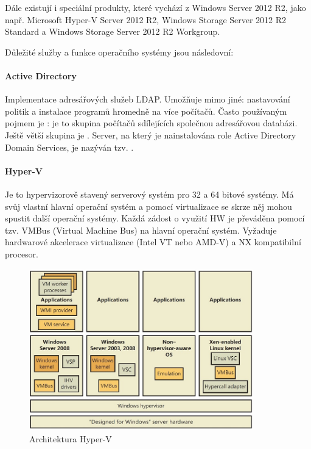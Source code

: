 Dále existují i speciální produkty, které vychází z Windows Server 2012 R2, jako např. Microsoft Hyper-V Server 2012 R2, Windows Storage Server 2012 R2 Standard a Windows Storage Server 2012 R2 Workgroup.

Důležité služby a funkce operačního systémy jsou následovní:

\paragraph{Active Directory}
Implementace adresářových služeb LDAP. Umožňuje mimo jiné: nastavování politik a instalace programů hromedně na více počítačů. Často používaným pojmem je : je to skupina počítačů sdílejících společnou adresářovou databázi. Ještě větší skupina je . Server, na který je nainstalována role Active Directory Domain Services, je nazýván tzv. . \cite{MasteringWindowsServer}

\paragraph{Hyper-V} 
Je to hypervizorově stavený serverový systém pro 32 a 64 bitové systémy. Má svůj vlastní hlavní operační systém a pomocí virtualizace se skrze něj mohou spustit další operační systémy. Každá zádost o využití HW je převáděna pomocí tzv. VMBus (Virtual Machine Bus) na hlavní operační systém. Vyžaduje hardwarové akcelerace virtualizace (Intel VT nebo AMD-V) a NX kompatibilní procesor. \cite{WindowsInternalsPart1}

\begin{figure}[]
  \centering
  \includegraphics[height=7cm]{fig/hyperv_architektura.jpg}
  \caption{Architektura Hyper-V \cite{WindowsInternalsPart1}}
  \label{fig:hypervarchitektura}
\end{figure}

